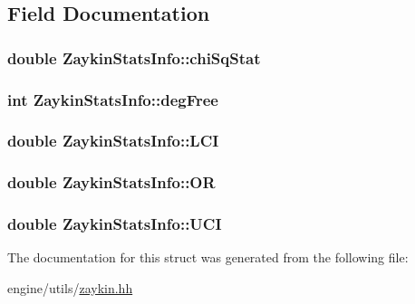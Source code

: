\subsection{Field Documentation}
\hypertarget{structZaykinStatsInfo_a28b66e969cdfd1f819ab622993aeea62}{
\subsubsection[{chiSqStat}]{\setlength{\rightskip}{0pt plus 5cm}double {\bf ZaykinStatsInfo::chiSqStat}}}
\label{structZaykinStatsInfo_a28b66e969cdfd1f819ab622993aeea62}
\hypertarget{structZaykinStatsInfo_aab543cdaa2227c8eda01598259bd0497}{
\subsubsection[{degFree}]{\setlength{\rightskip}{0pt plus 5cm}int {\bf ZaykinStatsInfo::degFree}}}
\label{structZaykinStatsInfo_aab543cdaa2227c8eda01598259bd0497}
\hypertarget{structZaykinStatsInfo_a427af93fef8a99a23312fc42b14b85ae}{
\subsubsection[{LCI}]{\setlength{\rightskip}{0pt plus 5cm}double {\bf ZaykinStatsInfo::LCI}}}
\label{structZaykinStatsInfo_a427af93fef8a99a23312fc42b14b85ae}
\hypertarget{structZaykinStatsInfo_a75784cfcc143155568b6877fafe7c4a6}{
\subsubsection[{OR}]{\setlength{\rightskip}{0pt plus 5cm}double {\bf ZaykinStatsInfo::OR}}}
\label{structZaykinStatsInfo_a75784cfcc143155568b6877fafe7c4a6}
\hypertarget{structZaykinStatsInfo_ae32b8c048ddaddd014e5cb33943a3167}{
\subsubsection[{UCI}]{\setlength{\rightskip}{0pt plus 5cm}double {\bf ZaykinStatsInfo::UCI}}}
\label{structZaykinStatsInfo_ae32b8c048ddaddd014e5cb33943a3167}


The documentation for this struct was generated from the following file:\begin{DoxyCompactItemize}
\item 
engine/utils/\hyperlink{zaykin_8hh}{zaykin.hh}\end{DoxyCompactItemize}
